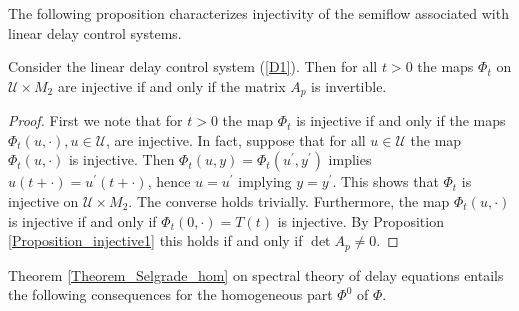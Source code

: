 \documentclass{siamltex}%
\begin{document}
The following proposition characterizes injectivity of the semiflow associated
with linear delay control systems.

\begin{proposition}
\label{Proposition_injective2}Consider the linear delay control system
(\ref{D1}). Then for all $t>0$ the maps $\Phi_{t}$ on $\mathcal{U}\times
M_{2}$ are injective if and only if the matrix $A_{p}$ is invertible.
\end{proposition}

\begin{proof}
First we note that for $t>0$ the map $\Phi_{t}$ is injective if and only if
the maps $\Phi_{t}(u,\cdot),u\in\mathcal{U}$, are injective. In fact, suppose
that for all $u\in\mathcal{U}$ the map $\Phi_{t}(u,\cdot)$ is injective. Then
$\Phi_{t}(u,y)=\Phi_{t}(u^{\prime},y^{\prime})$ implies $u(t+\cdot)=u^{\prime
}\left(  t+\cdot\right)  $, hence $u=u^{\prime}$ implying $y=y^{\prime}$. This
shows that $\Phi_{t}$ is injective on $\mathcal{U}\times M_{2}$. The converse
holds trivially. Furthermore, the map $\Phi_{t}(u,\cdot)$ is injective if and
only if $\Phi_{t}(0,\cdot)=T(t)$ is injective. By Proposition
\ref{Proposition_injective1} this holds if and only if $\det A_{p}\not =0$.
\end{proof}

Theorem \ref{Theorem_Selgrade_hom} on spectral theory of delay equations
entails the following consequences for the homogeneous part $\Phi^{0}$ of
$\Phi$.
\end{document}
